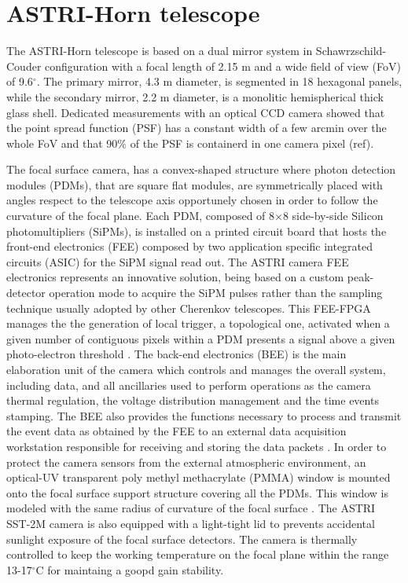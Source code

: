 \section{ASTRI-Horn telescope} 
The ASTRI-Horn telescope is based on a dual mirror system in Schawrzschild-Couder configuration
with a focal length of 2.15 m and a wide field of view (FoV) of 9.6$^\circ$. 
The primary mirror, 4.3 m diameter, is segmented in 18 hexagonal panels, 
while the secondary mirror, 2.2 m diameter, is a monolitic hemispherical thick glass shell. 
Dedicated measurements  with an optical CCD camera showed that the
point spread function (PSF) has a constant width of a few arcmin
over the whole FoV and that  90\% of the PSF  is containerd in one camera pixel (ref). 

The focal surface camera, has a convex-shaped structure where
photon detection modules (PDMs), that are square flat modules, are symmetrically placed
with angles respect to the telescope axis 
opportunely chosen in order to follow the curvature of the focal plane.
Each PDM, composed of 8$\times$8 side-by-side Silicon photomultipliers (SiPMs), 
is installed on a printed circuit board that hosts the front-end electronics (FEE) composed by
 two application specific integrated circuits (ASIC) for the SiPM signal read out.
 The ASTRI camera FEE electronics \cite{Sottile2016} represents an innovative solution, being based on a custom peak-detector operation mode to acquire the SiPM pulses rather than the sampling technique usually adopted by other Cherenkov telescopes.
This FEE-FPGA manages the the generation of local trigger, a topological one, activated when a given number of contiguous pixels within a PDM presents a signal above a given photo-electron threshold \cite{Sottile2016}.
The back-end electronics (BEE) is the main elaboration unit of the camera which
controls and manages the overall system, including data, and
all ancillaries used to perform operations as
the camera thermal regulation, the voltage distribution management and the time events stamping.
The BEE also provides the functions necessary to process and transmit the event data as 
obtained by the FEE to an external data acquisition 
workstation responsible for receiving and storing the data packets \cite{Sottile2016}.
In order to protect the camera sensors from the external
atmospheric environment, an optical-UV transparent poly methyl methacrylate (PMMA)  window 
is mounted onto the focal surface support structure covering all the PDMs.
This window is modeled with the same radius of curvature of the focal surface \cite{Catalano2018}.
The ASTRI SST-2M camera is also equipped  with a light-tight lid to prevents accidental sunlight 
exposure of the focal surface detectors.
The camera is thermally controlled to keep the working temperature on the focal plane within the range 13-17$^\circ$C
for maintaing a goopd gain stability.


